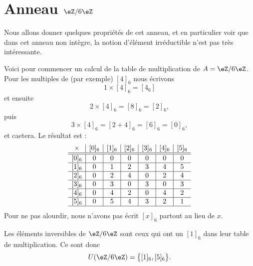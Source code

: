 \section{Anneau \texorpdfstring{\(  \eZ/6\eZ\)}{Z/6Z}}
\label{SECooSWGKooEeOZTO}

Nous allons donner quelques propriétés de cet anneau, et en particulier voir que dans cet anneau non intègre, la notion d'élément irréductible n'est pas très intéressante.

Voici pour commencer un calcul de la table de multiplication de \( A=\eZ/6\eZ\). Pour les multiples de (par exemple) \( [4]_6\) nous écrivons
\begin{equation}
	1\times [4]_6=[4_6]
\end{equation}
et ensuite
\begin{equation}
	2\times [4]_6=[8]_6=[2]_6,
\end{equation}
puis
\begin{equation}
	3\times [4]_6=[2+4]_6=[6]_6=[0]_6,
\end{equation}
et caetera. Le résultat est :
\begin{equation}
	\begin{array}{c|c|c|c|c|c|c}
		\times & [0]_6 & [1]_6 & [2]_6 & [3]_6 & [4]_6 & [5]_6 \\
		\hline\hline
		[0]_6  & 0     & 0     & 0     & 0     & 0     & 0     \\
		\hline
		[1]_6  & 0     & 1     & 2     & 3     & 4     & 5     \\
		\hline
		[2]_6  & 0     & 2     & 4     & 0     & 2     & 4     \\
		\hline
		[3]_6  & 0     & 3     & 0     & 3     & 0     & 3     \\
		\hline
		[4]_6  & 0     & 4     & 2     & 0     & 4     & 2     \\
		\hline
		[5]_6  & 0     & 5     & 4     & 3     & 2     & 1     \\
		\hline
	\end{array}
\end{equation}
Pour ne pas alourdir, nous n'avons pas écrit \( [x]_6\) partout au lieu de \( x\).

\begin{normaltext}[Inversibles]
	Les éléments inversibles de \( \eZ/6\eZ\) sont ceux qui ont un \( [1]_6\) dans leur table de multiplication. Ce sont donc
	\begin{equation}
		U(\eZ/6\eZ)=\big\{ [1]_6,[5]_6 \big\}.
	\end{equation}
\end{normaltext}

